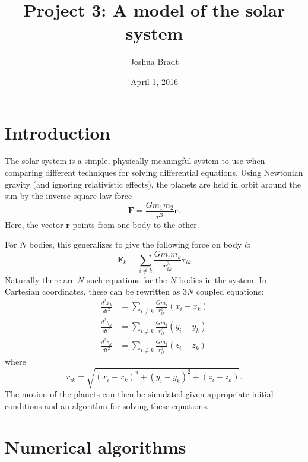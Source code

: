 \documentclass[aps,prc,reprint,nobalancelastpage]{revtex4-1}
\begin{document}
\title{Project 3: A model of the solar system}
\author{Joshua Bradt}
\noaffiliation
\date{April 1, 2016}

\maketitle

\section{Introduction}
\label{sec:introduction}

    The solar system is a simple, physically meaningful system to use when comparing different techniques for solving differential equations. Using Newtonian gravity (and ignoring relativistic effects), the planets are held in orbit around the sun by the inverse square law force
    \begin{equation}
        \mathbf{F} = \frac{G m_1 m_2}{r^3} \mathbf{r}.
    \end{equation}
    Here, the vector $\mathbf{r}$ points from one body to the other.

    For $N$ bodies, this generalizes to give the following force on body $k$:
    \begin{equation}
        \mathbf{F}_k = \sum_{i \neq k} \frac{G m_i m_k}{r_{ik}^3} \mathbf{r}_{ik}
    \end{equation}
    Naturally there are $N$ such equations for the $N$ bodies in the system. In Cartesian coordinates, these can be rewritten as $3N$ coupled equations:
    \begin{align}
        \frac{d^2 x_k}{dt^2} &= \sum_{i \neq k} \frac{G m_i}{r_{ik}^3} (x_i - x_k) \\
        \frac{d^2 y_k}{dt^2} &= \sum_{i \neq k} \frac{G m_i}{r_{ik}^3} (y_i - y_k) \\
        \frac{d^2 z_k}{dt^2} &= \sum_{i \neq k} \frac{G m_i}{r_{ik}^3} (z_i - z_k)
    \end{align}
    where
    \begin{equation}
        r_{ik} = \sqrt{(x_i - x_k)^2 + (y_i - y_k)^2 + (z_i - z_k)}.
    \end{equation}
    The motion of the planets can then be simulated given appropriate initial conditions and an algorithm for solving these equations.

\section{Numerical algorithms}
\label{sec:algorithms}
\end{document}
